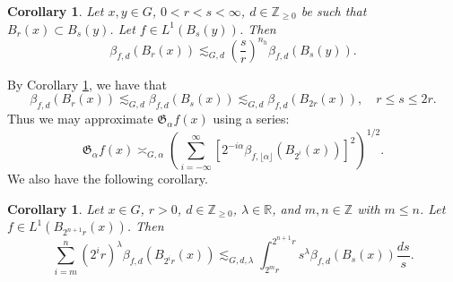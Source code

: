 \documentclass[11pt,reqno]{amsart}
\newtheorem{corollary}[theorem]{Corollary}
\newcommand{\1}{\mathbf 1}
\begin{document}
\begin{corollary}\label{monotoneBeta} Let $x,y \in G$, $0<r<s<\infty$, $d\in\mathbb{Z}_{\ge 0}$ be such that $B_r\left(x\right)\subset B_s\left(y\right)$. Let $f\in L^1\left(B_s\left(y\right)\right)$. Then
\[
\beta_{f,d}\left(B_r\left(x\right)\right) \lesssim_{G,d} \left(\frac{s}{r}\right)^{n_h}\beta_{f,d}\left(B_s\left(y\right)\right).
\]
\end{corollary}


By Corollary \ref{monotoneBeta}, we have that
\[
\beta_{f,d}\left(B_r\left(x\right)\right)\lesssim_{G,d} \beta_{f,d}\left(B_s\left(x\right)\right)\lesssim_{G,d} \beta_{f,d}\left(B_{2r}\left(x\right)\right),\quad r\le s\le 2r.
\]
Thus we may approximate $\mathfrak{G}_\alpha f\left(x\right)$ using a series:
\[
\mathfrak{G}_\alpha f\left(x\right)\asymp_{G,\alpha}\left(\sum_{i=-\infty}^\infty \left[2^{-i\alpha}\beta_{f,\lfloor\alpha\rfloor}\left(B_{2^i}\left(x\right)\right)\right]^2\right)^{1/2}.
\]
We also have the following corollary.
\begin{corollary}\label{cor:betaIntConversion}
    Let $x\in G$, $r>0$, $d\in \mathbb{Z}_{\ge 0}$, $\lambda\in \mathbb{R}$, and $m,n\in \mathbb{Z}$ with $m\le n$. Let $f\in L^1\left(B_{2^{n+1}r}\left(x\right)\right)$. Then
    \[
    \sum_{i=m}^n \left(2^ir\right)^\lambda \beta_{f,d}\left(B_{2^ir}\left(x\right)\right)\lesssim_{G,d,\lambda}\int_{2^mr}^{2^{n+1}r}s^\lambda \beta_{f,d}\left(B_s\left(x\right)\right)\frac{ds}{s}.
    \]
\end{corollary}
\end{document}
